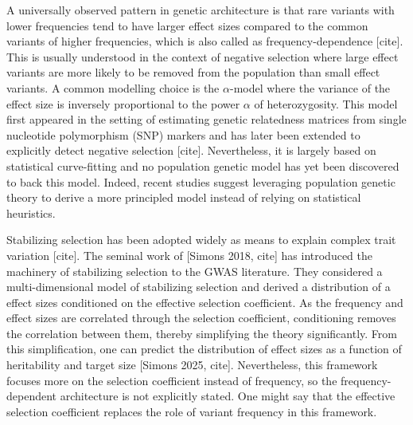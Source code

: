 \documentclass[10pt]{article}
\begin{document}
A universally observed pattern in genetic architecture is that rare variants with lower frequencies tend to have larger effect sizes compared to the common variants of higher frequencies,
which is also called as frequency-dependence [cite].
This is usually understood in the context of negative selection where large effect variants are more likely to be removed from the population than small effect variants.
A common modelling choice is the $\alpha$-model where the variance of the effect size is inversely proportional to the power $\alpha$ of heterozygosity.
This model first appeared in the setting of estimating genetic relatedness matrices from single nucleotide polymorphism (SNP) markers and has later been extended to explicitly detect negative selection [cite].
Nevertheless, it is largely based on statistical curve-fitting and no population genetic model has yet been discovered to back this model.
Indeed, recent studies suggest leveraging population genetic theory to derive a more principled model instead of relying on statistical heuristics.

Stabilizing selection has been adopted widely as means to explain complex trait variation [cite].
The seminal work of [Simons 2018, cite] has introduced the machinery of stabilizing selection to the GWAS literature.
They considered a multi-dimensional model of stabilizing selection and derived a distribution of a effect sizes conditioned on the effective selection coefficient.
As the frequency and effect sizes are correlated through the selection coefficient, 
conditioning removes the correlation between them, thereby simplifying the theory significantly.
From this simplification, one can predict the distribution of effect sizes as a function of heritability and target size [Simons 2025, cite].
Nevertheless, this framework focuses more on the selection coefficient instead of frequency, so the frequency-dependent architecture is not explicitly stated.
One might say that the effective selection coefficient replaces the role of variant frequency in this framework.
\end{document}
